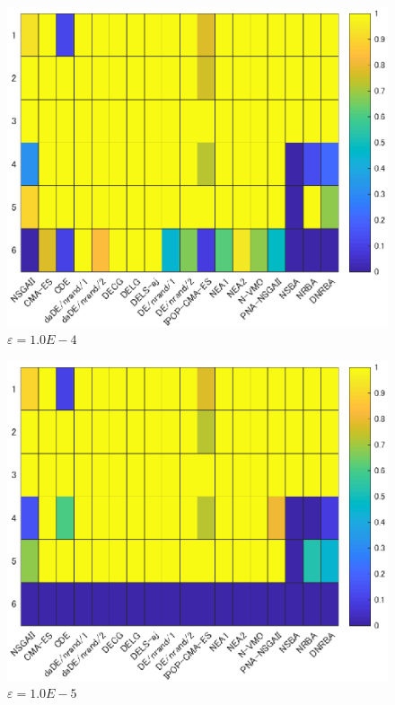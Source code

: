 \documentclass[a4j,11pt]{jarticle}
\def\proposed{DNRBA}
\begin{document}
\begin{figure}
\centering
\includegraphics[width=0.8\linewidth]{eps/E-4.eps}
\caption{$\varepsilon = 1.0E-4$}
\label{fig:resutls_comp_E4}
\end{figure}
\begin{figure}
\centering
\includegraphics[width=0.8\linewidth]{eps/E-5.eps}
\caption{$\varepsilon = 1.0E-5$}
\label{fig:resutls_comp_E5}
\end{figure}

\FloatBarrier
\end{document}
